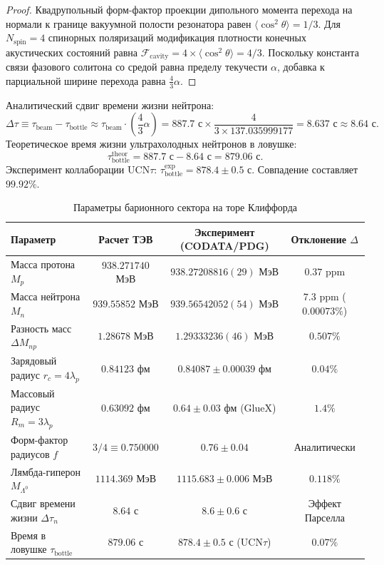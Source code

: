 \documentclass[11pt,a4paper]{article}
\theoremstyle{definition}
\theoremstyle{remark}
\begin{document}
\begin{proof}
Квадрупольный форм-фактор проекции дипольного момента перехода на нормали к границе вакуумной полости резонатора равен $\langle \cos^2\theta \rangle = 1/3$. Для $N_{\mathrm{spin}} = 4$ спинорных поляризаций модификация плотности конечных акустических состояний равна $\mathcal{F}_{\mathrm{cavity}} = 4 \times \langle \cos^2\theta \rangle = 4/3$. Поскольку константа связи фазового солитона со средой равна пределу текучести $\alpha$, добавка к парциальной ширине перехода равна $\frac{4}{3}\alpha$.
\end{proof}

Аналитический сдвиг времени жизни нейтрона:
\begin{equation}
    \Delta \tau \equiv \tau_{\mathrm{beam}} - \tau_{\mathrm{bottle}} \approx \tau_{\mathrm{beam}} \cdot \left( \frac{4}{3}\alpha \right) = 887.7\text{ с} \times \frac{4}{3 \times 137.035999177} = \mathbf{8.637\text{ с}} \approx \mathbf{8.64\text{ с}}.
\end{equation}
Теоретическое время жизни ультрахолодных нейтронов в ловушке:
\begin{equation}
    \tau_{\mathrm{bottle}}^{\mathrm{theor}} = 887.7\text{ с} - 8.64\text{ с} = \mathbf{879.06\text{ с}}.
\end{equation}
Эксперимент коллаборации $\mathrm{UCN}\tau$: $\tau_{\mathrm{bottle}}^{\mathrm{exp}} = 878.4 \pm 0.5$ с. Совпадение составляет $99.92\%$.

\begin{table}[H]
\centering
\small
\caption{Параметры барионного сектора на торе Клиффорда}
\label{tab:baryons}
\vspace{2mm}
\begin{tabular}{lccc}
\toprule
\textbf{Параметр} & \textbf{Расчет ТЭВ} & \textbf{Эксперимент (CODATA/PDG)} & \textbf{Отклонение $\Delta$} \\
\midrule
Масса протона $M_p$ & $938.271740$ МэВ & $938.27208816(29)$ МэВ & $0.37\text{ ppm}$ \\
Масса нейтрона $M_n$ & $939.55852$ МэВ & $939.56542052(54)$ МэВ & $7.3\text{ ppm}$ ($0.00073\%$) \\
Разность масс $\Delta M_{np}$ & $1.28678$ МэВ & $1.29333236(46)$ МэВ & $0.507\%$ \\
Зарядовый радиус $r_c = 4\lambda_p$ & $0.84123$ фм & $0.84087 \pm 0.00039$ фм & $0.04\%$ \\
Массовый радиус $R_m = 3\lambda_p$ & $0.63092$ фм & $0.64 \pm 0.03$ фм (GlueX) & $1.4\%$ \\
Форм-фактор радиусов $f$ & $3/4 \equiv 0.750000$ & $0.76 \pm 0.04$ & Аналитически \\
Лямбда-гиперон $M_{\Lambda^0}$ & $1114.369$ МэВ & $1115.683 \pm 0.006$ МэВ & $0.118\%$ \\
Сдвиг времени жизни $\Delta\tau_n$ & $8.64$ с & $8.6 \pm 0.6$ с & Эффект Парселла \\
Время в ловушке $\tau_{\mathrm{bottle}}$ & $879.06$ с & $878.4 \pm 0.5$ с ($\mathrm{UCN}\tau$) & $0.07\%$ \\
\bottomrule
\end{tabular}
\end{table}
\end{document}
